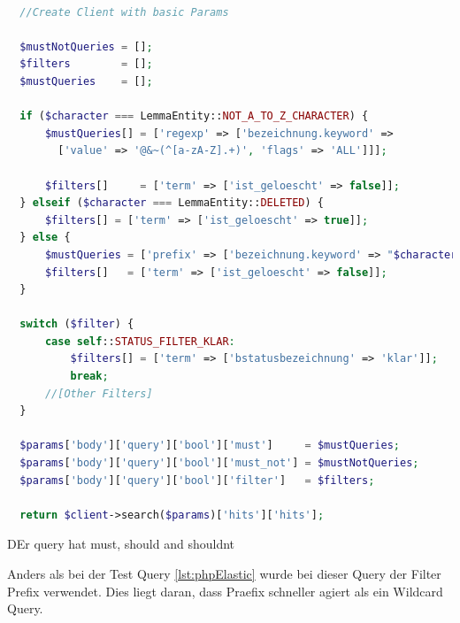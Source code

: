 \begin{lstlisting}[language=PHP, frame=single, label={lst:queryEla}] 

  //Create Client with basic Params

  $mustNotQueries = [];
  $filters        = [];
  $mustQueries    = [];

  if ($character === LemmaEntity::NOT_A_TO_Z_CHARACTER) {
      $mustQueries[] = ['regexp' => ['bezeichnung.keyword' => 
        ['value' => '@&~(^[a-zA-Z].+)', 'flags' => 'ALL']]];
        
      $filters[]     = ['term' => ['ist_geloescht' => false]];
  } elseif ($character === LemmaEntity::DELETED) {
      $filters[] = ['term' => ['ist_geloescht' => true]];
  } else {
      $mustQueries = ['prefix' => ['bezeichnung.keyword' => "$character"]];
      $filters[]   = ['term' => ['ist_geloescht' => false]];
  }

  switch ($filter) {
      case self::STATUS_FILTER_KLAR:
          $filters[] = ['term' => ['bstatusbezeichnung' => 'klar']];
          break;
      //[Other Filters]
  }

  $params['body']['query']['bool']['must']     = $mustQueries;
  $params['body']['query']['bool']['must_not'] = $mustNotQueries;
  $params['body']['query']['bool']['filter']   = $filters;

  return $client->search($params)['hits']['hits'];

\end{lstlisting}

DEr query hat must, should and shouldnt

Anders als bei der Test Query \ref{lst:phpElastic} wurde bei dieser Query der Filter Prefix verwendet. Dies liegt daran, dass Praefix schneller agiert als ein Wildcard Query.